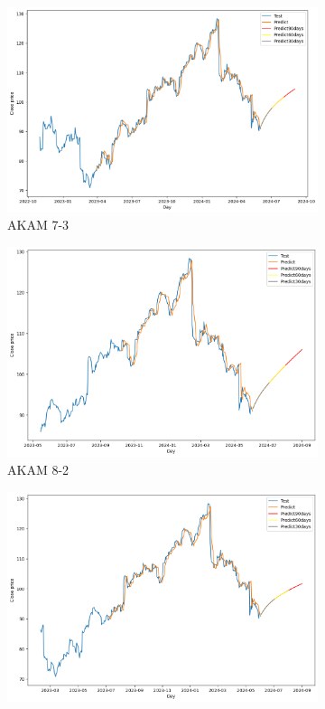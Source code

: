\documentclass{ieeeojies}
\begin{document}
\begin{figure}[H]
    \centering
    \begin{subfigure}[b]{0.33\linewidth}
        \centering
        \includegraphics[width=\linewidth]{GRU Plot/GRU_AKAM_7_3.png}
        \caption{AKAM 7-3}
        \label{fig:akam-7-3}
    \end{subfigure}%
    \hfill
    \begin{subfigure}[b]{0.33\linewidth}
        \centering
        \includegraphics[width=\linewidth]{GRU Plot/GRU_AKAM_8_2.png}
        \caption{AKAM 8-2}
        \label{fig:akam-8-2}
    \end{subfigure}%
    \hfill
    \begin{subfigure}[b]{0.33\linewidth}
        \centering
        \includegraphics[width=\linewidth]{GRU Plot/GRU_AKAM_75_25.png}

\end{subfigure}
\end{figure}
\end{document}
